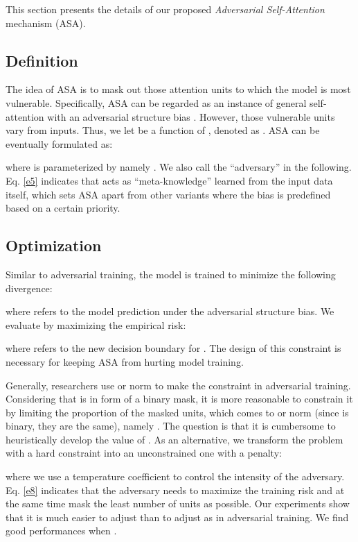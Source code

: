 \documentclass[letterpaper]{article} \usepackage{aaai23}  \usepackage{times}  \usepackage{helvet}  \usepackage{courier}  \usepackage[hyphens]{url}  \usepackage{graphicx} \urlstyle{rm} \def\UrlFont{\rm}  \usepackage{natbib}  \usepackage{caption} \frenchspacing  \setlength{\pdfpagewidth}{8.5in}  \setlength{\pdfpageheight}{11in}  \usepackage{algorithm}
\begin{document}
This section presents the details of our proposed \textit{Adversarial Self-Attention} mechanism (ASA).

\subsection{Definition}
\label{asa}

The idea of ASA is to mask out those attention units to which the model is most vulnerable. Specifically, ASA can be regarded as an instance of general self-attention with an adversarial structure bias . However, those vulnerable units vary from inputs. Thus, we let  be a function of , denoted as . ASA can be eventually formulated as:  

where  is parameterized by  namely . We also call  the ``adversary'' in the following. Eq. \ref{e5} indicates that  acts as ``meta-knowledge'' learned from the input data itself, which sets ASA apart from other variants where the bias is predefined based on a certain priority.

\subsection{Optimization}

Similar to adversarial training, the model is trained to minimize the following divergence:

where  refers to the model prediction under the adversarial structure bias. We evaluate  by maximizing the empirical risk:

where  refers to the new decision boundary for . The design of this constraint is necessary for keeping ASA from hurting model training.

Generally, researchers use  or  norm to make the constraint in adversarial training. Considering that  is in form of a binary mask, it is more reasonable to constrain it by limiting the proportion of the masked units, which comes to  or  norm (since  is binary, they are the same), namely . The question is that it is cumbersome to heuristically develop the value of .  As an alternative, we transform the problem with a hard constraint into an unconstrained one with a penalty:

where we use a temperature coefficient  to control the intensity of the adversary. Eq. \ref{e8} indicates that the adversary needs to maximize the training risk and at the same time mask the least number of units as possible. Our experiments show that it is much easier to adjust  than to adjust  as in adversarial training. We find good performances when .
\end{document}
